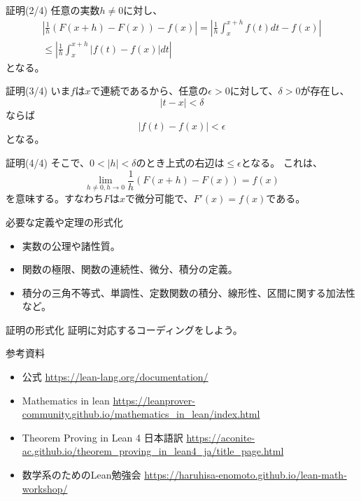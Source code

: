 \documentclass[unicode,12pt]{beamer}%
\begin{document}
\begin{frame}{証明(2/4)}
  任意の実数$h\neq0$に対し、
  \begin{align*}
    \left\lvert\frac{1}{h}(F(x+h)-F(x))-f(x)\right\rvert
    =\left\lvert\frac{1}{h}\int^{x+h}_xf(t)dt-f(x)\right\rvert\\
    \leq\left\lvert\frac{1}{h}\int^{x+h}_x\lvert f(t)-f(x)\rvert dt\right\rvert 
  \end{align*}
  となる。
\end{frame}

\begin{frame}{証明(3/4)}
  いま$f$は$x$で連続であるから、任意の$\epsilon>0$に対して、$\delta>0$が存在し、
  $$
  \lvert t-x\rvert<\delta
  $$
  ならば
  $$
  \lvert f(t)-f(x)\rvert<\epsilon
  $$
  となる。
\end{frame}

\begin{frame}{証明(4/4)}
  そこで、$0<\lvert h\rvert <\delta$のとき上式の右辺は$\leq\epsilon$となる。
  これは、
  $$
  \lim_{h\neq0,h\to0}\frac{1}{h}(F(x+h)-F(x))=f(x)
  $$
  を意味する。すなわち$F$は$x$で微分可能で、$F'(x)=f(x)$である。
\end{frame}

\begin{frame}{必要な定義や定理の形式化}
  \begin{itemize}
    \item 実数の公理や諸性質。
    \item 関数の極限、関数の連続性、微分、積分の定義。
    \item 積分の三角不等式、単調性、定数関数の積分、線形性、区間に関する加法性など。
  \end{itemize}
\end{frame}

\begin{frame}{証明の形式化}
  証明に対応するコーディングをしよう。
\end{frame}

\begin{frame}{参考資料}
  \begin{itemize}
    \item 公式 \url{https://lean-lang.org/documentation/}
    \item Mathematics in lean \url{https://leanprover-community.github.io/mathematics_in_lean/index.html}
    \item Theorem Proving in Lean 4 日本語訳 \url{https://aconite-ac.github.io/theorem_proving_in_lean4_ja/title_page.html}
    \item 数学系のためのLean勉強会 \url{https://haruhisa-enomoto.github.io/lean-math-workshop/}
  \end{itemize}
\end{frame}
\end{document}
